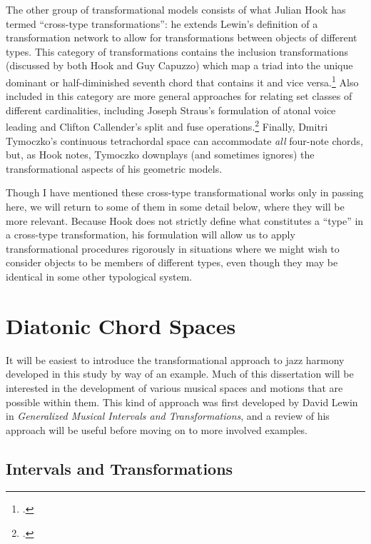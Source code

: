 \documentclass[diss]{subfiles}
\begin{document}
The other group of transformational models consists of what Julian Hook has
termed “cross-type transformations”: he extends Lewin’s definition of a
transformation network to allow for transformations between objects of
different types. This category of transformations contains the
inclusion transformations (discussed by both Hook and Guy Capuzzo) which map a
triad into the unique dominant or half-diminished seventh chord that contains
it and vice versa.\footcites{hook:2002,capuzzo:2004} Also included in this
category are more general approaches for relating set classes of different
cardinalities, including Joseph Straus’s formulation of atonal voice leading
and Clifton Callender’s split and fuse
operations.\footcites{straus:2003,callender:1998} Finally, Dmitri Tymoczko’s
continuous tetrachordal space can accommodate \emph{all} four-note chords, but,
as Hook notes, Tymoczko downplays (and sometimes ignores) the transformational
aspects of his geometric models.


Though I have mentioned these cross-type transformational works only in
passing here, we will return to some of them in some detail below, where they
will be more relevant. Because Hook does not strictly define what constitutes
a “type” in a cross-type transformation, his formulation will allow us to
apply transformational procedures rigorously in situations where we might wish
to consider objects to be members of different types, even though they may be
identical in some other typological system.


\section{Diatonic Chord Spaces}
\label{sec:diatonic-spaces} %

It will be easiest to introduce the transformational approach to jazz harmony
developed in this study by way of an example. Much of this dissertation will
be interested in the development of various musical spaces and motions that
are possible within them. This kind of approach was first developed by David
Lewin in \emph{Generalized Musical Intervals and Transformations}, and a
review of his approach will be useful before moving on to more involved
examples.

\subsection{Intervals and Transformations}
\label{subsec:inttrans} %
\end{document}
